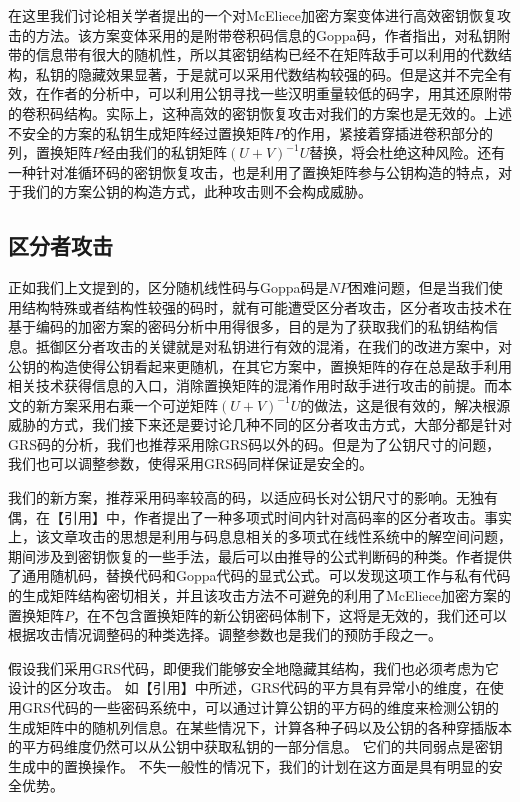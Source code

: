 在这里我们讨论相关学者提出的一个对McEliece加密方案变体进行高效密钥恢复攻击的方法。该方案变体采用的是附带卷积码信息的Goppa码，作者指出，对私钥附带的信息带有很大的随机性，所以其密钥结构已经不在矩阵敌手可以利用的代数结构，私钥的隐藏效果显著，于是就可以采用代数结构较强的码。但是这并不完全有效，在作者的分析中，可以利用公钥寻找一些汉明重量较低的码字，用其还原附带的卷积码结构。实际上，这种高效的密钥恢复攻击对我们的方案也是无效的。上述不安全的方案的私钥生成矩阵经过置换矩阵$P$的作用，紧接着穿插进卷积部分的列，置换矩阵$P$经由我们的私钥矩阵$(U+V)^{-1}U$替换，将会杜绝这种风险。还有一种针对准循环码的密钥恢复攻击，也是利用了置换矩阵参与公钥构造的特点，对于我们的方案公钥的构造方式，此种攻击则不会构成威胁。

\subsection{区分者攻击}
正如我们上文提到的，区分随机线性码与Goppa码是$NP$困难问题，但是当我们使用结构特殊或者结构性较强的码时，就有可能遭受区分者攻击，区分者攻击技术在基于编码的加密方案的密码分析中用得很多，目的是为了获取我们的私钥结构信息。抵御区分者攻击的关键就是对私钥进行有效的混淆，在我们的改进方案中，对公钥的构造使得公钥看起来更随机，在其它方案中，置换矩阵的存在总是敌手利用相关技术获得信息的入口，消除置换矩阵的混淆作用时敌手进行攻击的前提。而本文的新方案采用右乘一个可逆矩阵$(U+V)^{-1}U$的做法，这是很有效的，解决根源威胁的方式，我们接下来还是要讨论几种不同的区分者攻击方式，大部分都是针对GRS码的分析，我们也推荐采用除GRS码以外的码。但是为了公钥尺寸的问题，我们也可以调整参数，使得采用GRS码同样保证是安全的。

我们的新方案，推荐采用码率较高的码，以适应码长对公钥尺寸的影响。无独有偶，在【引用】中，作者提出了一种多项式时间内针对高码率的区分者攻击。事实上，该文章攻击的思想是利用与码息息相关的多项式在线性系统中的解空间问题，期间涉及到密钥恢复的一些手法，最后可以由推导的公式判断码的种类。作者提供了通用随机码，替换代码和Goppa代码的显式公式。可以发现这项工作与私有代码的生成矩阵结构密切相关，并且该攻击方法不可避免的利用了McEliece加密方案的置换矩阵$P$，在不包含置换矩阵的新公钥密码体制下，这将是无效的，我们还可以根据攻击情况调整码的种类选择。调整参数也是我们的预防手段之一。

假设我们采用GRS代码，即便我们能够安全地隐藏其结构，我们也必须考虑为它设计的区分攻击。 如【引用】中所述，GRS代码的平方具有异常小的维度，在使用GRS代码的一些密码系统中，可以通过计算公钥的平方码的维度来检测公钥的生成矩阵中的随机列信息。在某些情况下，计算各种子码以及公钥的各种穿插版本的平方码维度仍然可以从公钥中获取私钥的一部分信息。 它们的共同弱点是密钥生成中的置换操作。 不失一般性的情况下，我们的计划在这方面是具有明显的安全优势。

